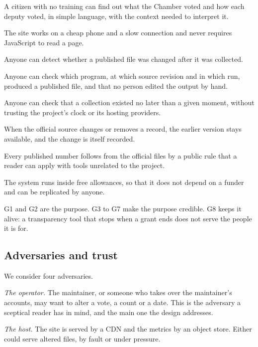 \begin{description}[leftmargin=1.2em,style=nextline,itemsep=2pt]
\item[G1. Closeness.] A citizen with no training can find out what the Chamber voted and how each deputy voted, in simple language, with the context needed to interpret it.
\item[G2. Reach.] The site works on a cheap phone and a slow connection and never requires JavaScript to read a page.
\item[G3. Integrity.] Anyone can detect whether a published file was changed after it was collected.
\item[G4. Provenance.] Anyone can check which program, at which source revision and in which run, produced a published file, and that no person edited the output by hand.
\item[G5. Time.] Anyone can check that a collection existed no later than a given moment, without trusting the project's clock or its hosting providers.
\item[G6. History.] When the official source changes or removes a record, the earlier version stays available, and the change is itself recorded.
\item[G7. Recomputation.] Every published number follows from the official files by a public rule that a reader can apply with tools unrelated to the project.
\item[G8. Zero cost.] The system runs inside free allowances, so that it does not depend on a funder and can be replicated by anyone.
\end{description}

G1 and G2 are the purpose. G3 to G7 make the purpose credible. G8 keeps it alive: a transparency tool that stops when a grant ends does not serve the people it is for.

\subsection{Adversaries and trust}

We consider four adversaries.

\emph{The operator.} The maintainer, or someone who takes over the maintainer's accounts, may want to alter a vote, a count or a date. This is the adversary a sceptical reader has in mind, and the main one the design addresses.

\emph{The host.} The site is served by a CDN and the metrics by an object store. Either could serve altered files, by fault or under pressure.

